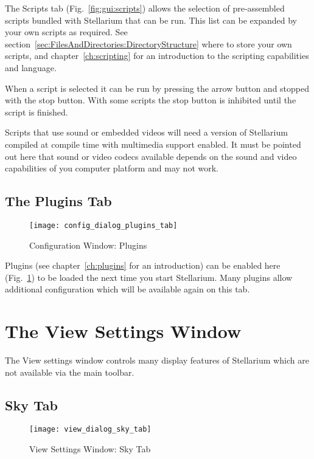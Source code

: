 The Scripts tab (Fig.~\ref{fig:gui:scripts}) allows the selection of
pre-assembled scripts bundled with Stellarium that can be run. This
list can be expanded by your own scripts as required. See
section~\ref{sec:FilesAndDirectories:DirectoryStructure} where to
store your own scripts, and chapter~\ref{ch:scripting} for an
introduction to the scripting capabilities and language.

When a script is selected it can be run by pressing the arrow button
and stopped with the stop button. With some scripts the stop button is
inhibited until the script is finished. %

Scripts that use sound or embedded videos will need a version of
Stellarium compiled at compile time with multimedia support
enabled. It must be pointed out here that sound or video codecs
available depends on the sound and video capabilities of you computer
platform and may not work.


\subsection{The Plugins Tab }
\label{sec:gui:configuration:plugins}


\begin{figure}[p]
\centering\texttt{[image: config\_dialog\_plugins\_tab]}
\caption{Configuration Window: Plugins}
\label{fig:gui:plugins}
\end{figure}

Plugins (see chapter~\ref{ch:plugins} for an introduction) can be
enabled here (Fig.~\ref{fig:gui:plugins}) to be loaded the next time
you start Stellarium.  Many plugins allow additional configuration
which will be available again on this tab.




\section{The View Settings Window}\label{the-view-settings-window}

The View settings window controls many display features of Stellarium
which are not available via the main toolbar.

\subsection{Sky Tab}\label{sky-tab}

\begin{figure}[h]
\centering\texttt{[image: view\_dialog\_sky\_tab]}
\caption{View Settings Window: Sky Tab}
\label{fig:viewwinskytab}
\end{figure}

